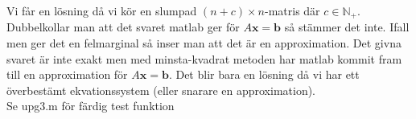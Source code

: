 Vi får en lösning då vi kör en slumpad $(n+c)\times n$-matris där $c\in\mathbb{N}_{+}$.
Dubbelkollar man att det svaret matlab ger för $A\bm{x}=\bm{b}$ så stämmer det inte.
Ifall men ger det en felmarginal så inser man att det är en approximation.
Det givna svaret är inte exakt men med minsta-kvadrat metoden har matlab kommit fram till en approximation för $A\bm{x}=\bm{b}$.
Det blir bara en lösning då vi har ett överbestämt ekvationssystem (eller snarare en approximation).\\
Se upg3.m för färdig test funktion